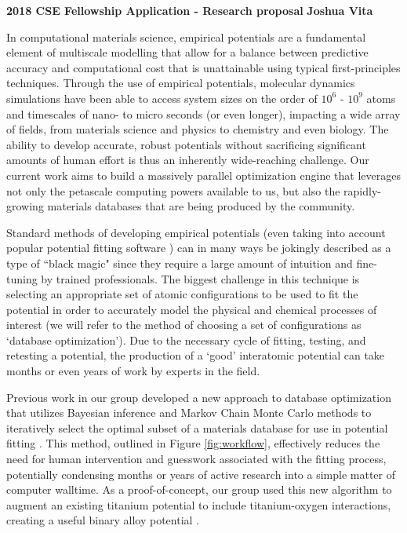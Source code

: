 \documentclass{article}
\begin{document}
\begin{center}
    \textbf{2018 CSE Fellowship Application - Research proposal}
\hfill
\textbf{Joshua Vita}
\end{center}
\noindent\hrulefill

\bigskip

In computational materials science, empirical potentials are a fundamental element of multiscale modelling that allow for a balance between predictive accuracy and computational cost that is unattainable using typical first-principles techniques. Through the use of empirical potentials, molecular dynamics simulations have been able to access system sizes on the order of $10^6$ - $10^9$ atoms and timescales of nano- to micro seconds (or even longer), impacting a wide array of fields, from materials science and physics to chemistry and even biology. The ability to develop accurate, robust potentials without sacrificing significant amounts of human effort is thus an inherently wide-reaching challenge. Our current work aims to build a massively parallel optimization engine that leverages not only the petascale computing powers available to us, but also the rapidly-growing materials databases that are being produced by the community.

\bigskip

Standard methods of developing empirical potentials (even taking into account popular potential fitting software \cite{potfit}) can in many ways be jokingly described as a type of ``black magic" since they require a large amount of intuition and fine-tuning by trained professionals. The biggest challenge in this technique is selecting an appropriate set of atomic configurations to be used to fit the potential in order to accurately model the physical and chemical processes of interest (we will refer to the method of choosing a set of configurations as `database optimization'). Due to the necessary cycle of fitting, testing, and retesting a potential, the production of a `good' interatomic potential can take months or even years of work by experts in the field.

Previous work in our group developed a new approach to database optimization that utilizes Bayesian inference \cite{baye} and Markov Chain Monte Carlo methods to iteratively select the optimal subset of a materials database for use in potential fitting \cite{dbopt}. This method, outlined in Figure \ref{fig:workflow}, effectively reduces the need for human intervention and guesswork associated with the fitting process, potentially condensing months or years of active research into a simple matter of computer walltime. As a proof-of-concept, our group used this new algorithm to augment an existing titanium potential to include titanium-oxygen interactions, creating a useful binary alloy potential \cite{tio}.
\end{document}
